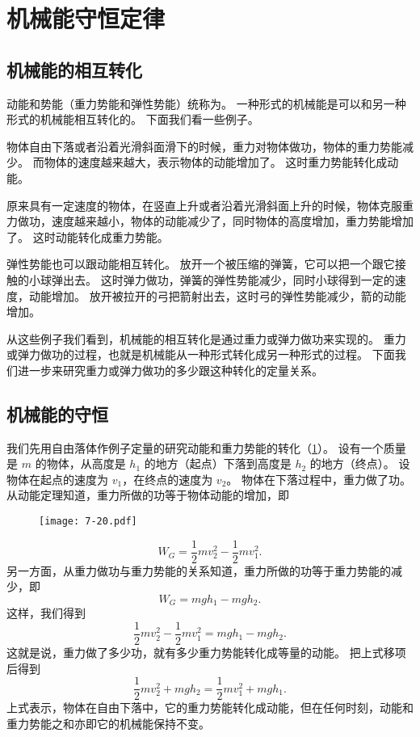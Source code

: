 \section{机械能守恒定律}
\subsection{机械能的相互转化}
动能和势能（重力势能和弹性势能）统称为。
一种形式的机械能是可以和另一种形式的机械能相互转化的。
下面我们看一些例子。

物体自由下落或者沿着光滑斜面滑下的时候，重力对物体做功，物体的重力势能减少。
而物体的速度越来越大，表示物体的动能增加了。
这时重力势能转化成动能。

原来具有一定速度的物体，在竖直上升或者沿着光滑斜面上升的时候，物体克服重力做功，速度越来越小，物体的动能减少了，同时物体的高度增加，重力势能增加了。
这时动能转化成重力势能。

弹性势能也可以跟动能相互转化。
放开一个被压缩的弹簧，它可以把一个跟它接触的小球弹出去。
这时弹力做功，弹簧的弹性势能减少，同时小球得到一定的速度，动能增加。
放开被拉开的弓把箭射出去，这时弓的弹性势能减少，箭的动能增加。

从这些例子我们看到，机械能的相互转化是通过重力或弹力做功来实现的。
重力或弹力做功的过程，也就是机械能从一种形式转化成另一种形式的过程。
下面我们进一步来研究重力或弹力做功的多少跟这种转化的定量关系。

\subsection{机械能的守恒} 
我们先用自由落体作例子定量的研究动能和重力势能的转化（\cref{fig:7-20}）。
设有一个质量是 $m$ 的物体，从高度是 $h_1$ 的地方（起点）下落到高度是 $h_2$ 的地方（终点）。
设物体在起点的速度为 $v_1$，在终点的速度为 $v_2$。
物体在下落过程中，重力做了功。
从动能定理知道，重力所做的功等于物体动能的增加，即
\begin{figure}
  \texttt{[image: 7-20.pdf]}
  \caption{}\label{fig:7-20}
\end{figure}
\[W_G=\frac{1}{2}mv_2^2-\frac{1}{2}mv^2_1.\]
另一方面，从重力做功与重力势能的关系知道，重力所做的功等于重力势能的减少，即
\[W_G=mgh_1-mgh_2.\]
这样，我们得到
\[\frac{1}{2}mv_2^2-\frac{1}{2}mv^2_1 =mgh_1-mgh_2.\]
这就是说，重力做了多少功，就有多少重力势能转化成等量的动能。
把上式移项后得到
\[ \frac{1}{2}mv^2_2 +mgh_2=\frac{1}{2}mv^2_1 +mgh_1.\]
上式表示，物体在自由下落中，它的重力势能转化成动能，但在任何时刻，动能和重力势能之和亦即它的机械能保持不变。

